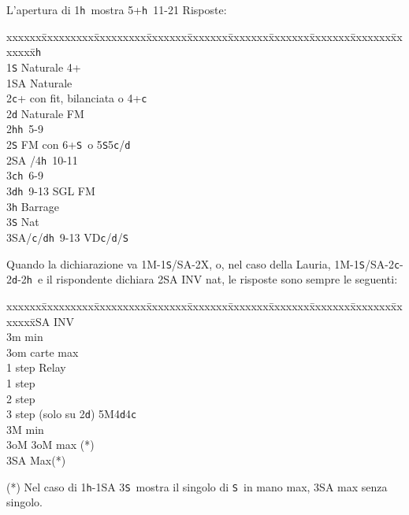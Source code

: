 \documentclass[a4paper,italian]{article}
\newcommand{\BS}{\small{\texttt{S}}}
\newcommand{\BC}{\small{\texttt{c}}}
\newcommand{\BD}{\small{\texttt{d}}}
\newcommand{\BH}{\small{\texttt{h}}}
\newenvironment{bidtable}
{\begin{tabbing}

    xxxxxx\=xxxxxxxxx\=xxxxxxxxx\=xxxxxxx\=xxxxxxx\=xxxxxxx\=xxxxxxx\=xxxxxxx\=xxxxxxx\=xxxxxxx\=\kill}
{\end{tabbing} }%
\newenvironment{sviluppi}
{\begin{tcolorbox}[colframe=azzurro,title=Sviluppi particolari]}
    {
\end{tcolorbox} }%
\begin{document}
\begin{multicols*}{2}
    L'apertura di 1\BH\ mostra 5+\BH\ 11-21
    Risposte:
    \begin{bidtable}
        1\BH\+\\
        1\BS \>\> Naturale 4+\\
        1\small{SA} \>\> Naturale\\
        2\BC \>+ con fit, bilanciata o 4+\BC \\
        2\BD \>\> Naturale FM\\
        2\BH \>\BH\ 5-9\\
        2\BS \>\> FM con 6+\BS\ o 5\BS 5\BC /\BD \\
        2\small{SA} \>/4\BH\ 10-11\\
        3\BC \>\BH\ 6-9\\
        3\BD \>\BH\ 9-13 SGL FM\\
        3\BH \>\> Barrage\\
        3\BS \>\> Nat\\
        3\small{SA}/\BC/\BD \>\BH\ 9-13 VD\BC /\BD /\BS \-
    \end{bidtable}

    \begin{sviluppi}\label{1Maggiore}
        Quando la dichiarazione va 1M-1\BS/SA-2X, o, nel caso della Lauria, 1M-1\BS/SA-2\BC-2\BD-2\BH\ e il rispondente dichiara 2\small{SA} INV nat, le risposte sono sempre le seguenti:
        \smallbreak
        \begin{bidtable}
            2\small{SA} \> INV\+\\
            3m  min\\
            3om  carte max\+\\
            1 step \> Relay\+\\
            1 step \\
            2 step \\
            3 step (solo su 2\BD)\>\> \> 5M4\BD4\BC\-\-\\
            3M  min\\
            3oM \> 3oM max (*)\\
            3\small{SA} \> Max(*)\-\\
        \end{bidtable}
        (*) Nel caso di 1\BH-1\small{SA} 3\BS\ mostra il singolo di \BS\ in mano max, 3\small{SA} max senza singolo.
    \end{sviluppi}


\end{multicols*}
\end{document}
